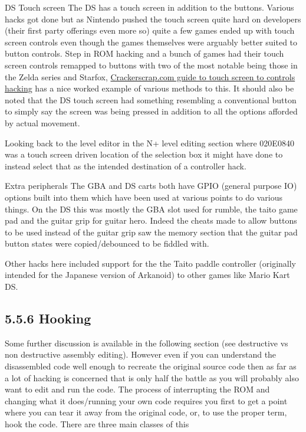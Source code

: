\documentclass[
]{book}
\begin{document}
DS Touch screen The DS has a touch screen in addition to the buttons. Various hacks got done but as Nintendo pushed the touch screen quite hard on developers (their first party offerings even more so) quite a few games ended up with touch screen controls even though the games themselves were arguably better suited to button controls. Step in ROM hacking and a bunch of games had their touch screen controls remapped to buttons with two of the most notable being those in the Zelda series and Starfox, \href{https://web.archive.org/web/20110604163902/http://crackerscrap.com/docs/sfchacktut.html}{Crackerscrap.com guide to touch screen to controls hacking} has a nice worked example of various methods to this. It should also be noted that the DS touch screen had something resembling a conventional button to simply say the screen was being pressed in addition to all the options afforded by actual movement.

Looking back to the level editor in the N+ level editing section where 020E0840 was a touch screen driven location of the selection box it might have done to instead select that as the intended destination of a controller hack.

Extra peripherals The GBA and DS carts both have GPIO (general purpose IO) options built into them which have been used at various points to do various things. On the DS this was mostly the GBA slot used for rumble, the taito game pad and the guitar grip for guitar hero. Indeed the cheats made to allow buttons to be used instead of the guitar grip saw the memory section that the guitar pad button states were copied/debounced to be fiddled with.

Other hacks here included support for the the Taito paddle controller (originally intended for the Japanese version of Arkanoid) to other games like Mario Kart DS.

\hypertarget{hooking}{%
\subsection{5.5.6 Hooking}\label{hooking}}

Some further discussion is available in the following section (see destructive vs non destructive assembly editing). However even if you can understand the disassembled code well enough to recreate the original source code then as far as a lot of hacking is concerned that is only half the battle as you will probably also want to edit and run the code. The process of interrupting the ROM and changing what it does/running your own code requires you first to get a point where you can tear it away from the original code, or, to use the proper term, hook the code. There are three main classes of this
\end{document}

